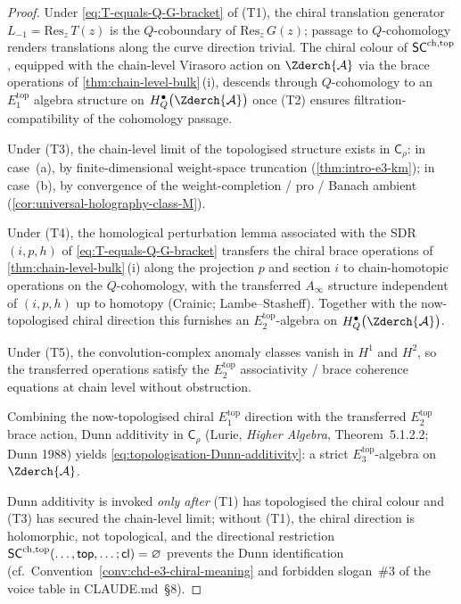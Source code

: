 \begin{proof}
Under \eqref{eq:T-equals-Q-G-bracket} of \textup{(T1)}, the chiral
translation generator $L_{-1} = \mathrm{Res}_{z}\, T(z)$ is the
$Q$-coboundary of $\mathrm{Res}_{z}\, G(z)$; passage to $Q$-cohomology
renders translations along the curve direction trivial.  The
chiral colour of $\mathsf{SC}^{\mathrm{ch},\mathrm{top}}$, equipped with the chain-level Virasoro
action on $\Zderch{\cA}$ via the brace operations of
\cref{thm:chain-level-bulk}\,(i), descends through $Q$-cohomology
to an $E_{1}^{\mathrm{top}}$ algebra structure on
$H^{\bullet}_{Q}\bigl(\Zderch{\cA}\bigr)$ once \textup{(T2)} ensures
filtration-compatibility of the cohomology passage.

Under \textup{(T3)}, the chain-level limit of the topologised
structure exists in $\mathsf{C}_{\rho}$: in case~\textup{(a)}, by
finite-dimensional weight-space truncation
(\cref{thm:intro-e3-km}); in case~\textup{(b)}, by convergence of
the weight-completion / pro / Banach ambient
(\cref{cor:universal-holography-class-M}).

Under \textup{(T4)}, the homological perturbation lemma associated
with the SDR $(i, p, h)$ of \eqref{eq:T-equals-Q-G-bracket} transfers
the chiral brace operations of \cref{thm:chain-level-bulk}\,(i)
along the projection $p$ and section $i$ to chain-homotopic
operations on the $Q$-cohomology, with the transferred $A_{\infty}$
structure independent of $(i, p, h)$ up to homotopy
(Crainic; Lambe--Stasheff).  Together with the now-topologised chiral
direction this furnishes an $E_{2}^{\mathrm{top}}$-algebra on
$H^{\bullet}_{Q}\bigl(\Zderch{\cA}\bigr)$.

Under \textup{(T5)}, the convolution-complex anomaly classes
vanish in $H^{1}$ and $H^{2}$, so the transferred operations satisfy
the $E_{2}^{\mathrm{top}}$ associativity / brace coherence equations
at chain level without obstruction.

Combining the now-topologised chiral $E_{1}^{\mathrm{top}}$ direction
with the transferred $E_{2}^{\mathrm{top}}$ brace action, Dunn
additivity in $\mathsf{C}_{\rho}$
(Lurie, \emph{Higher Algebra}, Theorem~5.1.2.2; Dunn 1988) yields
\eqref{eq:topologisation-Dunn-additivity}: a strict
$E_{3}^{\mathrm{top}}$-algebra on $\Zderch{\cA}$.

Dunn additivity is invoked \emph{only after} \textup{(T1)} has
topologised the chiral colour and \textup{(T3)} has secured the
chain-level limit; without \textup{(T1)}, the chiral direction is
holomorphic, not topological, and the directional restriction
$\mathsf{SC}^{\mathrm{ch},\mathrm{top}}(\ldots, \mathsf{top}, \ldots; \mathsf{cl}) = \varnothing$
prevents the Dunn identification (cf.\
Convention~\ref{conv:chd-e3-chiral-meaning} and forbidden slogan~\#3
of the voice table in CLAUDE.md~\S 8).
\end{proof}

